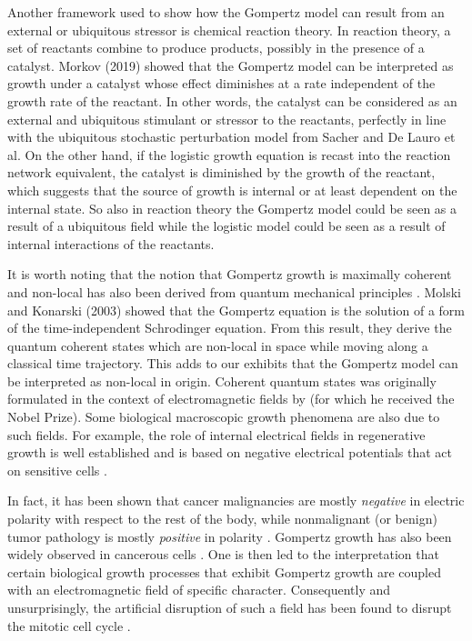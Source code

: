 \documentclass{article}
\begin{document}
Another framework used to show how the Gompertz model can result from an external or ubiquitous stressor is chemical reaction theory. In reaction theory, a set of reactants combine to produce products, possibly in the presence of a catalyst. Morkov (2019) \cite{markov2019reaction} showed that the Gompertz model can be interpreted as growth under a catalyst whose effect diminishes at a rate independent of the growth rate of the reactant. In other words, the catalyst can be considered as an external and ubiquitous stimulant or stressor to the reactants, perfectly in line with the ubiquitous stochastic perturbation model from Sacher and De Lauro et al. On the other hand, if the logistic growth equation is recast into the reaction network equivalent, the catalyst is diminished by the growth of the reactant, which suggests that the source of growth is internal or at least dependent on the internal state. So also in reaction theory the Gompertz model could be seen as a result of a ubiquitous field while the logistic model could be seen as a result of internal interactions of the reactants. 

It is worth noting that the notion that Gompertz growth is maximally coherent and non-local has also been derived from quantum mechanical principles \cite{molski2003coherent}. Molski and Konarski (2003) showed that the Gompertz equation is the solution of a form of the time-independent Schrodinger equation. From this result, they derive the quantum coherent states which are non-local in space while moving along a classical time trajectory. This adds to our exhibits that the Gompertz model can be interpreted as non-local in origin. Coherent quantum states was originally formulated in the context of electromagnetic fields by \citet{glauber1963coherent} (for which he received the Nobel Prize). Some biological macroscopic growth phenomena are also due to such fields. For example, the role of internal electrical fields in regenerative growth is well established and is based on negative electrical potentials that act on sensitive cells \cite{becker1984electromagnetic}. 

In fact, it has been shown that cancer malignancies are mostly \textit{negative} in electric polarity with respect to the rest of the body, while nonmalignant (or benign) tumor pathology is mostly \textit{positive} in polarity \cite{langman1949technique}. Gompertz growth has also been widely observed in cancerous cells \cite{kozusko2003combining,laird1964dynamics}. One is then led to the interpretation that certain biological growth processes that exhibit Gompertz growth are coupled with an electromagnetic field of specific character. Consequently and unsurprisingly, the artificial disruption of such a field has been found to disrupt the mitotic cell cycle \cite{goodman1983pulsing,liboff1981alternating,norton1984bioelectric,liboff1984time}. 
\end{document}
